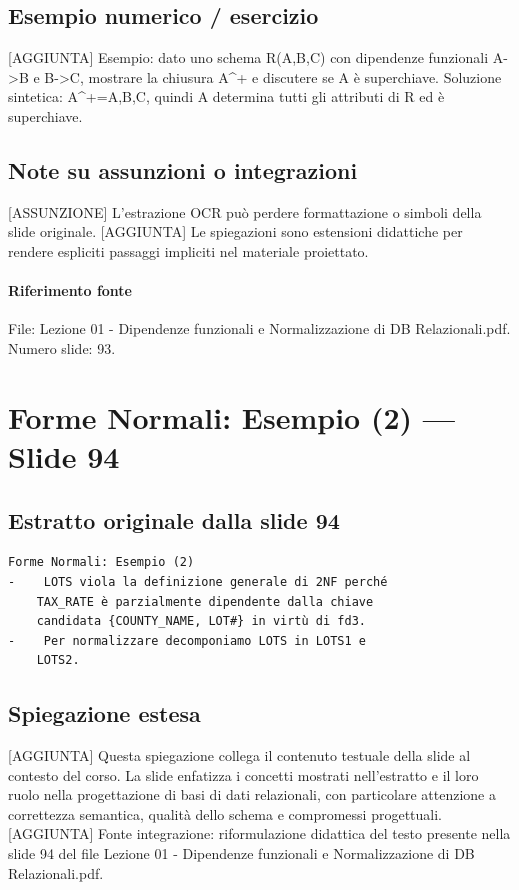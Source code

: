 \documentclass[11pt]{article}
\begin{document}
\subsection*{Esempio numerico / esercizio}
[AGGIUNTA] Esempio: dato uno schema R(A,B,C) con dipendenze funzionali A->B e B->C, mostrare la chiusura A^+ e discutere se A è superchiave. Soluzione sintetica: A^+={A,B,C}, quindi A determina tutti gli attributi di R ed è superchiave.
\subsection*{Note su assunzioni o integrazioni}
[ASSUNZIONE] L'estrazione OCR può perdere formattazione o simboli della slide originale.
[AGGIUNTA] Le spiegazioni sono estensioni didattiche per rendere espliciti passaggi impliciti nel materiale proiettato.
\paragraph{Riferimento fonte} File: Lezione 01 - Dipendenze funzionali e Normalizzazione di DB Relazionali.pdf. Numero slide: 93.
\section{Forme Normali: Esempio (2) --- Slide 94}
\subsection*{Estratto originale dalla slide 94}
\begin{lstlisting}
Forme Normali: Esempio (2)
-    LOTS viola la definizione generale di 2NF perché
    TAX_RATE è parzialmente dipendente dalla chiave
    candidata {COUNTY_NAME, LOT#} in virtù di fd3.
-    Per normalizzare decomponiamo LOTS in LOTS1 e
    LOTS2.
\end{lstlisting}
\subsection*{Spiegazione estesa}
[AGGIUNTA] Questa spiegazione collega il contenuto testuale della slide al contesto del corso. La slide enfatizza i concetti mostrati nell'estratto e il loro ruolo nella progettazione di basi di dati relazionali, con particolare attenzione a correttezza semantica, qualità dello schema e compromessi progettuali.
[AGGIUNTA] Fonte integrazione: riformulazione didattica del testo presente nella slide 94 del file Lezione 01 - Dipendenze funzionali e Normalizzazione di DB Relazionali.pdf.
\end{document}

